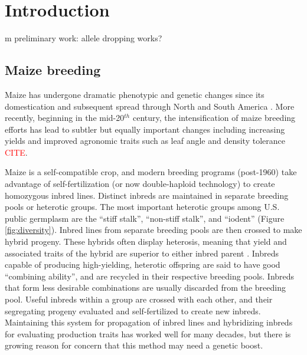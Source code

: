 \documentclass[12pt]{article}
\begin{document}
\section*{Introduction}
\label{sec:introduction}


m preliminary work: allele dropping works?

\subsection*{Maize breeding}
Maize has undergone dramatic phenotypic and genetic changes since its domestication and subsequent spread through North and South America \citep{daFonseca:2015ey,Doebley:2004ce}. More recently, beginning in the mid-20$^{th}$ century, the intensification of maize breeding efforts has lead to subtler but equally important changes including increasing yields and improved agronomic traits such as leaf angle and density tolerance \textcolor{red}{CITE}. 

Maize is  a self-compatible crop, and modern breeding programs (post-1960) take advantage of self-fertilization (or now double-haploid technology) to create homozygous inbred lines. 
Distinct inbreds are maintained in separate breeding pools or heterotic groups.
The most important heterotic groups among U.S. public germplasm are the ``stiff stalk'', ``non-stiff stalk'', and ``iodent'' (Figure \ref{fig:diversity}).
Inbred lines from separate breeding pools are then crossed to make hybrid progeny.  
These hybrids often display heterosis, meaning that yield and associated traits of the hybrid are superior to  either inbred parent \citep{Springer:2007bj}.  
Inbreds capable of producing high-yielding, heterotic offspring are said to have good ``combining ability'', and are recycled in their respective breeding pools.
Inbreds that form less desirable combinations are usually discarded from the breeding pool. 
Useful inbreds within a group are crossed with each other, and their segregating progeny evaluated and self-fertilized to create new inbreds. 
Maintaining this system for propagation of inbred lines and hybridizing inbreds for evaluating production traits has worked well for many decades, but there is growing reason for concern that this method may need a genetic boost. 
\end{document}
